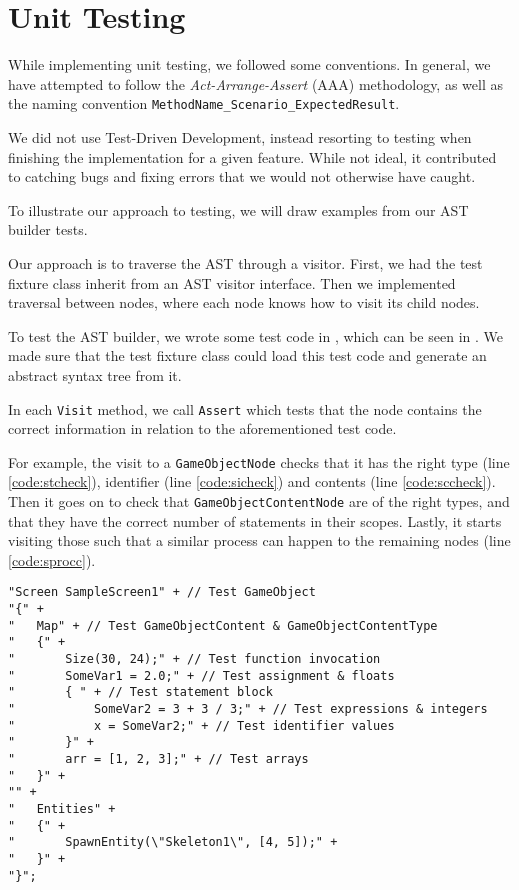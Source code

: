 \section{Unit Testing}
While implementing unit testing, we followed some conventions.
In general, we have attempted to follow the \textit{Act-Arrange-Assert} (AAA)
methodology, as well as the naming convention 
\texttt{MethodName\_Scenario\_ExpectedResult}.

We did not use Test-Driven Development, instead resorting to testing
when finishing the implementation for a given feature. While not ideal, it
contributed to catching bugs and fixing errors that we would not
otherwise have caught.

To illustrate our approach to testing, we will draw examples from our
AST builder tests.

Our approach is to traverse the AST through a visitor. First,
we had the test fixture class inherit from an AST visitor interface.
Then we implemented traversal between nodes, where each node knows how
to visit its child nodes.

To test the AST builder, we wrote some test code in \dazel{}, which can be seen in . We made sure that
the test fixture class could load this test code and generate an abstract syntax tree from it.

In each \texttt{Visit} method, we call \texttt{Assert} which tests
that the node contains the correct information in relation to the
aforementioned \dazel{} test code.

For example, the visit to a \texttt{GameObjectNode} checks that it has the
right type (line \ref{code:stcheck}), identifier (line \ref{code:sicheck}) and contents (line \ref{code:sccheck}). Then it goes on to check that
\texttt{GameObjectContentNode} are of the right types, and that they have
the correct number of statements in their scopes. Lastly, it starts visiting
those such that a similar process can happen to the remaining nodes (line \ref{code:sprocc}).

\begin{lstlisting}[language=CSharp, caption={AST Builder \dazel{} test code.}, label={lst:asttestcode}]
"Screen SampleScreen1" + // Test GameObject
"{" +
"   Map" + // Test GameObjectContent & GameObjectContentType
"   {" +
"       Size(30, 24);" + // Test function invocation
"       SomeVar1 = 2.0;" + // Test assignment & floats
"       { " + // Test statement block
"           SomeVar2 = 3 + 3 / 3;" + // Test expressions & integers
"           x = SomeVar2;" + // Test identifier values
"       }" +
"       arr = [1, 2, 3];" + // Test arrays
"   }" +
"" +
"   Entities" +
"   {" +
"       SpawnEntity(\"Skeleton1\", [4, 5]);" +
"   }" +
"}";
\end{lstlisting}


